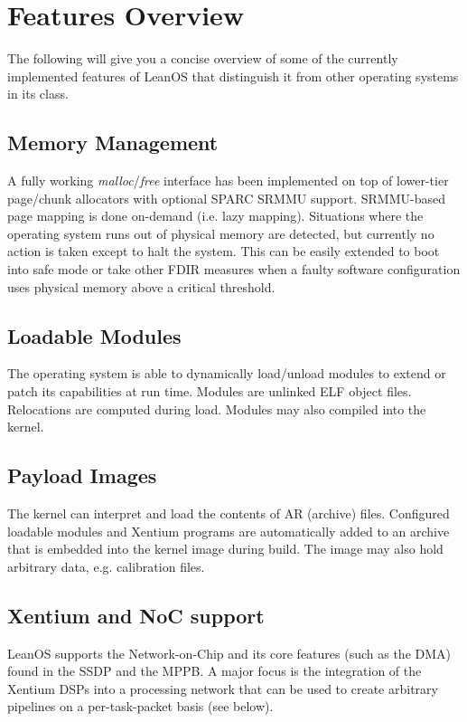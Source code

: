 \section {Features Overview}

The following will give you a concise overview of some of the currently 
implemented features of LeanOS that distinguish it from other operating
systems in its class.

\subsection {Memory Management}

A fully working \emph{malloc}/\emph{free} interface has been implemented on top
of lower-tier page/chunk allocators with optional SPARC SRMMU support.
SRMMU-based page mapping is done on-demand (i.e. lazy mapping). Situations
where the operating system runs out of physical memory are detected, but
currently no action is taken except to halt the system. This can be easily
extended to boot into safe mode or take other FDIR measures when a faulty
software configuration uses physical memory above a critical threshold.

\subsection {Loadable Modules}

The operating system is able to dynamically load/unload modules to extend
or patch its capabilities at run time. Modules are unlinked ELF object files.
Relocations are computed during load. Modules may also compiled into the kernel.

\subsection {Payload Images}

The kernel can interpret and load the contents of AR (archive) files. Configured
loadable modules and Xentium programs are automatically added to an archive
that is embedded into the kernel image during build. The image may also hold
arbitrary data, e.g. calibration files.


\subsection {Xentium and NoC support}

LeanOS supports the Network-on-Chip and its core features (such as the DMA)
found in the \gls{SSDP} and the \gls{MPPB}. A major focus is the integration
of the \gls{Xentium} \glspl{DSP} into a processing network that can be used to
create arbitrary pipelines on a per-task-packet basis (see below).

